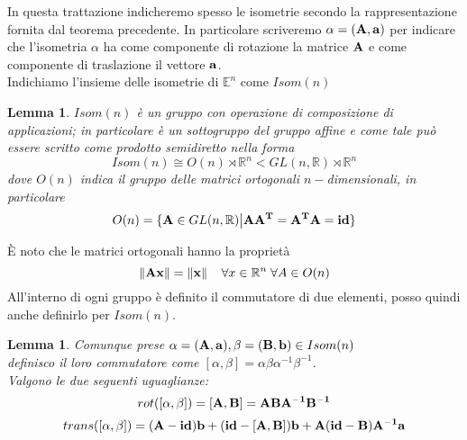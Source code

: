 \documentclass[a4paper,11pt,openright,twoside	]{book}
\newtheorem{lemma}[theorem]{Lemma}
\begin{document}
In questa trattazione indicheremo spesso le isometrie secondo la rappresentazione fornita dal teorema precedente. In particolare scriveremo $\alpha = ( \vb{A, a})  $ per indicare che l'isometria $\alpha$ ha come componente di rotazione la matrice $\vb{A}$ e come componente di traslazione il vettore $\vb{a}$. \\
Indichiamo l'insieme delle isometrie di  $\mathbb{E}^{n} $ come $Isom(n)$
\begin{lemma}
$Isom(n)$ è un gruppo con operazione di composizione di applicazioni; in particolare è un sottogruppo del gruppo affine e come tale può essere scritto come prodotto semidiretto nella forma
\[ Isom(n) \cong   O(n) \rtimes \mathbb{R}^{n} <  GL(n, \mathbb{R}) \rtimes\mathbb{R}^{n} 
\]
dove $O(n)$ indica il gruppo delle matrici ortogonali $n-$dimensionali, in particolare 
\[ O(n) = \{ \vb{A} \in GL(n, \mathbb{R}) \big| \vb{A A^{T}} = \vb{A^{T} A} = \vb{id} \}\]
\end{lemma}

\`E noto che le matrici ortogonali hanno la proprietà
\[ \norm{\vb{Ax}} = \norm{\vb{x}}   \; \; \; \; \forall x \in \mathbb{R}^n \; \forall A \in O(n)\]
All'interno di ogni gruppo è definito il commutatore di due elementi, posso quindi anche definirlo per $Isom(n)$.
\begin{lemma}
\label{lemma:1}
	Comunque prese  $ \alpha = (\vb{A,a}), \beta = (\vb{B,b}) \in Isom(n)$\\
	definisco il loro commutatore come  $ [ \alpha , \beta] = \alpha \beta \alpha^{-1} \beta^{-1}$. \\
Valgono le due seguenti uguaglianze:
\begin{equation}
rot([ \alpha	, \beta ]) = \vb{[A, B]} = \vb{ABA^{-1}B^{-1}}
\end{equation}  
\begin{equation}
trans([ \alpha	, \beta ]) = \vb{(A-id)b+(id-[A,B])b+A(id-B)A^{-1}a }
\end{equation} 
\end{lemma}
\end{document}
